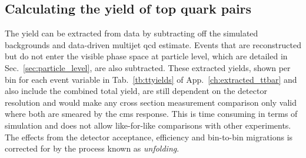 \subsection{Calculating the yield of top quark pairs} %
\label{sub:calculating_the_yield}

The \ttbar{} yield can be extracted from data by subtracting off the simulated backgrounds and data-driven multijet \acrshort{qcd} estimate.
Events that are reconstructed but do not enter the visible phase space at particle level, which are detailed in Sec.~\ref{sec:particle_level}, are also subtracted.
These extracted \ttbar{} yields, shown per bin for each event variable in Tab.~\ref{tb:ttyields} of App.~\ref{ch:extracted_ttbar} and also include the combined total yield, are still dependent on the detector resolution and would make any cross section measurement comparison only valid where both are smeared by the \acrshort{cms} response.
This is time consuming in terms of simulation and does not allow like-for-like comparisons with other experiments.
The effects from the detector acceptance, efficiency and bin-to-bin migrations is corrected for by the process known as \textit{unfolding}.



